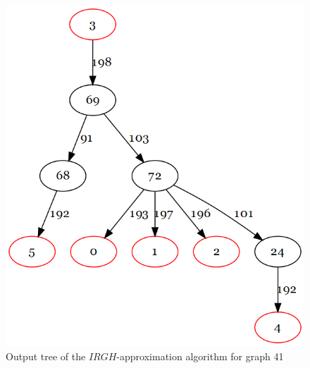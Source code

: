 \begin{figure}[htbp]
\centering
\includegraphics[scale=0.40]{figures/HougardyProemel.png}
\caption{Output tree of the $IRGH$-approximation algorithm for graph 41}\label{fig:HoPrTree41}
\end{figure}
